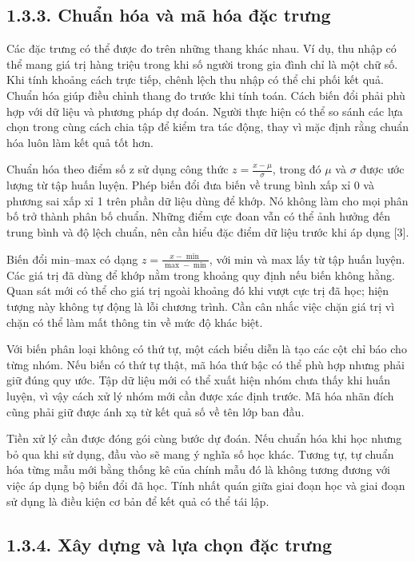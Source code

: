 \subsection{1.3.3. Chuẩn hóa và mã hóa đặc trưng}

Các đặc trưng có thể được đo trên những thang khác nhau. Ví dụ, thu nhập có thể mang giá trị hàng triệu trong khi số người trong gia đình chỉ là một chữ số. Khi tính khoảng cách trực tiếp, chênh lệch thu nhập có thể chi phối kết quả. Chuẩn hóa giúp điều chỉnh thang đo trước khi tính toán. Cách biến đổi phải phù hợp với dữ liệu và phương pháp dự đoán. Người thực hiện có thể so sánh các lựa chọn trong cùng cách chia tập để kiểm tra tác động, thay vì mặc định rằng chuẩn hóa luôn làm kết quả tốt hơn.


Chuẩn hóa theo điểm số z sử dụng công thức \(z=\frac{x-\mu}{\sigma}\), trong đó \ensuremath{\mu} và \ensuremath{\sigma} được ước lượng từ tập huấn luyện. Phép biến đổi đưa biến về trung bình xấp xỉ 0 và phương sai xấp xỉ 1 trên phần dữ liệu dùng để khớp. Nó không làm cho mọi phân bố trở thành phân bố chuẩn. Những điểm cực đoan vẫn có thể ảnh hưởng đến trung bình và độ lệch chuẩn, nên cần hiểu đặc điểm dữ liệu trước khi áp dụng [3].


Biến đổi min–max có dạng \(z=\frac{x-\min}{\max-\min}\), với min và max lấy từ tập huấn luyện. Các giá trị đã dùng để khớp nằm trong khoảng quy định nếu biến không hằng. Quan sát mới có thể cho giá trị ngoài khoảng đó khi vượt cực trị đã học; hiện tượng này không tự động là lỗi chương trình. Cần cân nhắc việc chặn giá trị vì chặn có thể làm mất thông tin về mức độ khác biệt.


Với biến phân loại không có thứ tự, một cách biểu diễn là tạo các cột chỉ báo cho từng nhóm. Nếu biến có thứ tự thật, mã hóa thứ bậc có thể phù hợp nhưng phải giữ đúng quy ước. Tập dữ liệu mới có thể xuất hiện nhóm chưa thấy khi huấn luyện, vì vậy cách xử lý nhóm mới cần được xác định trước. Mã hóa nhãn đích cũng phải giữ được ánh xạ từ kết quả số về tên lớp ban đầu.


Tiền xử lý cần được đóng gói cùng bước dự đoán. Nếu chuẩn hóa khi học nhưng bỏ qua khi sử dụng, đầu vào sẽ mang ý nghĩa số học khác. Tương tự, tự chuẩn hóa từng mẫu mới bằng thống kê của chính mẫu đó là không tương đương với việc áp dụng bộ biến đổi đã học. Tính nhất quán giữa giai đoạn học và giai đoạn sử dụng là điều kiện cơ bản để kết quả có thể tái lập.


\subsection{1.3.4. Xây dựng và lựa chọn đặc trưng}

